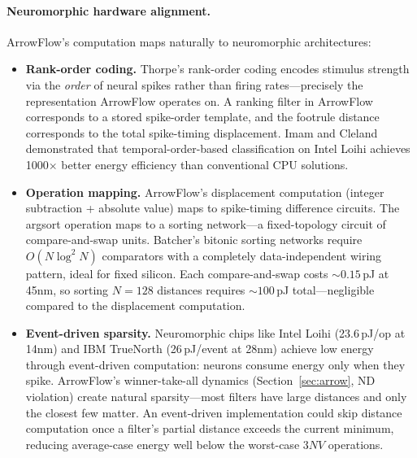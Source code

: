\documentclass[12pt]{article}
\begin{document}
\paragraph{Neuromorphic hardware alignment.}
ArrowFlow's computation maps naturally to neuromorphic architectures:

\begin{itemize}[leftmargin=2em]
  \item \textbf{Rank-order coding.} Thorpe's rank-order coding \citep{thorpe1998rapid, thorpe2001spike} encodes stimulus strength via the \emph{order} of neural spikes rather than firing rates---precisely the representation ArrowFlow operates on. A ranking filter in ArrowFlow corresponds to a stored spike-order template, and the footrule distance corresponds to the total spike-timing displacement. Imam and Cleland \citep{imam2020rapid} demonstrated that temporal-order-based classification on Intel Loihi achieves 1000$\times$ better energy efficiency than conventional CPU solutions.

  \item \textbf{Operation mapping.} ArrowFlow's displacement computation (integer subtraction + absolute value) maps to spike-timing difference circuits. The argsort operation maps to a sorting network---a fixed-topology circuit of compare-and-swap units. Batcher's bitonic sorting networks \citep{batcher1968sorting} require $O(N \log^2 N)$ comparators with a completely data-independent wiring pattern, ideal for fixed silicon. Each compare-and-swap costs ${\sim}0.15$\,pJ at 45nm, so sorting $N = 128$ distances requires ${\sim}100$\,pJ total---negligible compared to the displacement computation.

  \item \textbf{Event-driven sparsity.} Neuromorphic chips like Intel Loihi \citep{davies2018loihi} (23.6\,pJ/op at 14nm) and IBM TrueNorth \citep{merolla2014million} (26\,pJ/event at 28nm) achieve low energy through event-driven computation: neurons consume energy only when they spike. ArrowFlow's winner-take-all dynamics (Section~\ref{sec:arrow}, ND violation) create natural sparsity---most filters have large distances and only the closest few matter. An event-driven implementation could skip distance computation once a filter's partial distance exceeds the current minimum, reducing average-case energy well below the worst-case $3NV$ operations.
\end{itemize}
\end{document}
